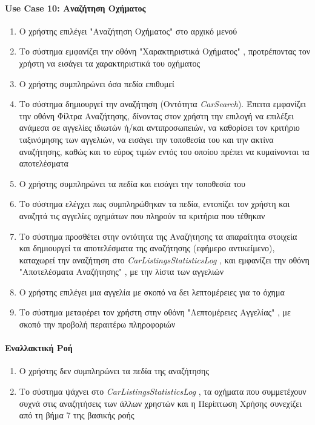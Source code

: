 \documentclass{../ol-softwaremanual}
\begin{document}
	\paragraph{\en Use Case 10: \gr Αναζήτηση Οχήματος}  
	\begin{enumerate}
		\item Ο χρήστης επιλέγει \en"\gr Αναζήτηση Οχήματος\en" \gr στο αρχικό μενού
		\item Το σύστημα εμφανίζει την οθόνη \en"\gr Χαρακτηριστικά Οχήματος\en" \gr, προτρέποντας τον χρήστη να εισάγει τα χαρακτηριστικά του οχήματος 
		\item Ο χρήστης συμπληρώνει όσα πεδία επιθυμεί
		\item Το σύστημα δημιουργεί την αναζήτηση (Οντότητα \en \textit{CarSearch}\gr). Έπειτα εμφανίζει την οθόνη Φίλτρα Αναζήτησης, δίνοντας στον χρήστη την επιλογή να επιλέξει ανάμεσα σε αγγελίες ιδιωτών ή/και αντιπροσωπειών, να καθορίσει τον κριτήριο ταξινόμησης των αγγελιών, να εισάγει την τοποθεσία του και την ακτίνα αναζήτησης, καθώς και το εύρος τιμών εντός του οποίου πρέπει να κυμαίνονται τα αποτελέσματα
		\item Ο χρήστης συμπληρώνει τα πεδία και εισάγει την τοποθεσία του 
		\item Το σύστημα ελέγχει πως συμπληρώθηκαν τα πεδία, εντοπίζει τον χρήστη και αναζητά τις αγγελίες οχημάτων που πληρούν τα κριτήρια που τέθηκαν		
		\item Το σύστημα προσθέτει στην οντότητα της Αναζήτησης τα απαραίτητα στοιχεία και δημιουργεί τα αποτελέσματα της αναζήτησης (εφήμερο αντικείμενο), καταχωρεί την αναζήτηση στο \en \textit{CarListingsStatisticsLog} \gr, και εμφανίζει την οθόνη \en"\gr Αποτελέσματα Αναζήτησης\en" \gr, με την λίστα των αγγελιών 
		\item Ο χρήστης επιλέγει μια αγγελία με σκοπό να δει λεπτομέρειες για το όχημα
		\item Το σύστημα μεταφέρει τον χρήστη στην οθόνη \en"\gr Λεπτομέρειες Αγγελίας\en" \gr, με σκοπό την προβολή περαιτέρω πληροφοριών	
	\end{enumerate}
	
	
	\paragraph{Εναλλακτική Ροή}
		\begin{enumerate}
			\item Ο χρήστης δεν συμπληρώνει τα πεδία της αναζήτησης
			\item Το σύστημα ψάχνει στο \en \textit{CarListingsStatisticsLog} \gr, τα οχήματα που συμμετέχουν συχνά στις αναζητήσεις των άλλων χρηστών και η Περίπτωση Χρήσης συνεχίζει από τη βήμα 7 της βασικής ροής
	\end{enumerate}
	
\end{document}
